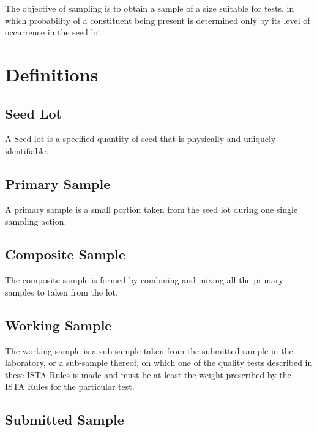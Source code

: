 \documentclass[
]{book}
\begin{document}
The objective of sampling is to obtain a sample of a size suitable for tests, in which probability of a constituent being present is determined only by its level of occurrence in the seed lot.

\hypertarget{definitions}{%
\section{Definitions}\label{definitions}}

\hypertarget{seed-lot}{%
\subsection{Seed Lot}\label{seed-lot}}

A Seed lot is a specified quantity of seed that is physically and uniquely identifiable.

\hypertarget{primary-sample}{%
\subsection{Primary Sample}\label{primary-sample}}

A primary sample is a small portion taken from the seed lot during one single sampling action.

\hypertarget{composite-sample}{%
\subsection{Composite Sample}\label{composite-sample}}

The composite sample is formed by combining and mixing all the primary samples to taken from the lot.

\hypertarget{working-sample}{%
\subsection{Working Sample}\label{working-sample}}

The working sample is a sub-sample taken from the submitted sample in the laboratory, or a sub-sample thereof, on which one of the quality tests described in these ISTA Rules is made and must be at least the weight prescribed by the ISTA Rules for the particular test.

\hypertarget{submitted-sample}{%
\subsection{Submitted Sample}\label{submitted-sample}}
\end{document}
